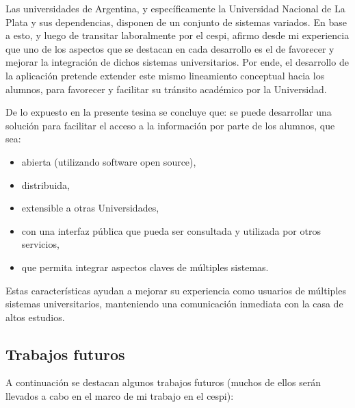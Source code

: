
Las universidades de Argentina, y específicamente la Universidad Nacional de La Plata y sus dependencias, disponen de un conjunto de sistemas variados. En base a esto, y luego de transitar laboralmente por el \gls{cespi}, afirmo desde mi experiencia que uno de los aspectos que se destacan en cada desarrollo es el de favorecer y mejorar la integración de dichos sistemas universitarios. Por ende, el desarrollo de la aplicación \nombreApp{} pretende extender este mismo lineamiento conceptual hacia los alumnos, para favorecer y facilitar su tránsito académico por la Universidad.

De lo expuesto en la presente tesina se concluye que: se puede desarrollar una solución para facilitar el acceso a la información por parte de los alumnos, que sea:
\begin{itemize}
\item abierta (utilizando software \gls{open source}),
\item distribuida,
\item extensible a otras Universidades,
\item con una interfaz pública que pueda ser consultada y utilizada por otros servicios,
\item que permita integrar aspectos claves de múltiples sistemas.
\end{itemize}
Estas características ayudan a mejorar su experiencia como usuarios de múltiples sistemas universitarios, manteniendo una comunicación inmediata con la casa de altos estudios.

\subsection{Trabajos futuros}
\label{trabajos_futuros}

A continuación se destacan algunos trabajos futuros (muchos de ellos serán llevados a cabo en el marco de mi trabajo en el \gls{cespi}):

